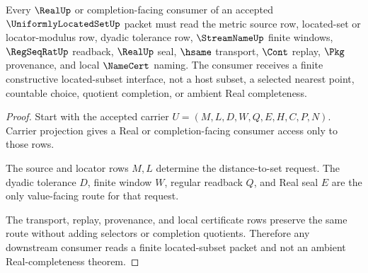 \begin{theorem}
\label{thm:uniformly-located-set-real-completion-route}
Every $\RealUp$ or completion-facing consumer of an accepted $\UniformlyLocatedSetUp$ packet must read the metric source row, located-set or locator-modulus row, dyadic tolerance row, $\StreamNameUp$ finite windows, $\RegSeqRatUp$ readback, $\RealUp$ seal, $\hsame$ transport, $\Cont$ replay, $\Pkg$ provenance, and local $\NameCert$ naming. The consumer receives a finite constructive located-subset interface, not a host subset, a selected nearest point, countable choice, quotient completion, or ambient Real completeness.
\end{theorem}
\begin{proof}
Start with the accepted carrier $U=(M,L,D,W,Q,E,H,C,P,N)$. Carrier projection gives a Real or completion-facing consumer access only to those rows.

The source and locator rows $M,L$ determine the distance-to-set request. The dyadic tolerance $D$, finite window $W$, regular readback $Q$, and Real seal $E$ are the only value-facing route for that request.

The transport, replay, provenance, and local certificate rows preserve the same route without adding selectors or completion quotients. Therefore any downstream consumer reads a finite located-subset packet and not an ambient Real-completeness theorem.
\end{proof}




